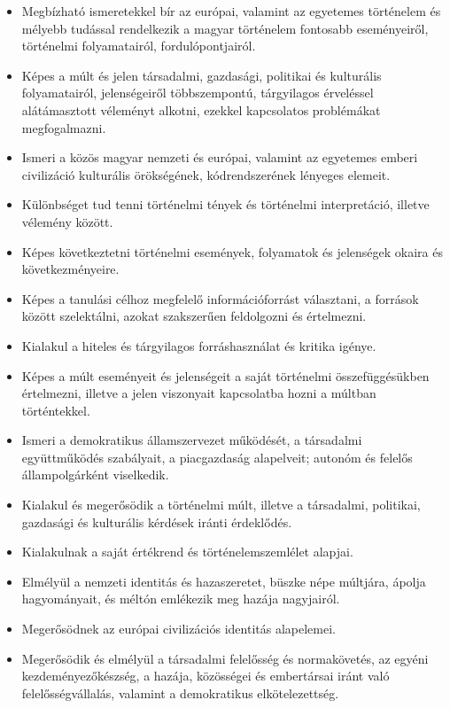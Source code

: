 \begin{itemize}
\item
  Megbízható ismeretekkel bír az európai, valamint az egyetemes
  történelem és mélyebb tudással rendelkezik a magyar történelem
  fontosabb eseményeiről, történelmi folyamatairól, fordulópontjairól.
\item
  Képes a múlt és jelen társadalmi, gazdasági, politikai és kulturális
  folyamatairól, jelenségeiről többszempontú, tárgyilagos érveléssel
  alátámasztott véleményt alkotni, ezekkel kapcsolatos problémákat
  megfogalmazni.
\item
  Ismeri a közös magyar nemzeti és európai, valamint az egyetemes emberi
  civilizáció kulturális örökségének, kódrendszerének lényeges elemeit.
\item
  Különbséget tud tenni történelmi tények és történelmi interpretáció,
  illetve vélemény között.
\item
  Képes következtetni történelmi események, folyamatok és jelenségek
  okaira és következményeire.
\item
  Képes a tanulási célhoz megfelelő információforrást választani, a
  források között szelektálni, azokat szakszerűen feldolgozni és
  értelmezni.
\item
  Kialakul a hiteles és tárgyilagos forráshasználat és kritika igénye.
\item
  Képes a múlt eseményeit és jelenségeit a saját történelmi
  összefüggésükben értelmezni, illetve a jelen viszonyait kapcsolatba
  hozni a múltban történtekkel.
\item
  Ismeri a demokratikus államszervezet működését, a társadalmi
  együttműködés szabályait, a piacgazdaság alapelveit; autonóm és
  felelős állampolgárként viselkedik.
\item
  Kialakul és megerősödik a történelmi múlt, illetve a társadalmi,
  politikai, gazdasági és kulturális kérdések iránti érdeklődés.
\item
  Kialakulnak a saját értékrend és történelemszemlélet alapjai.
\item
  Elmélyül a nemzeti identitás és hazaszeretet, büszke népe múltjára,
  ápolja hagyományait, és méltón emlékezik meg hazája nagyjairól.
\item
  Megerősödnek az európai civilizációs identitás alapelemei.
\item
  Megerősödik és elmélyül a társadalmi felelősség és normakövetés, az
  egyéni kezdeményezőkészség, a hazája, közösségei és embertársai iránt
  való felelősségvállalás, valamint a demokratikus elkötelezettség.

\end{itemize}
